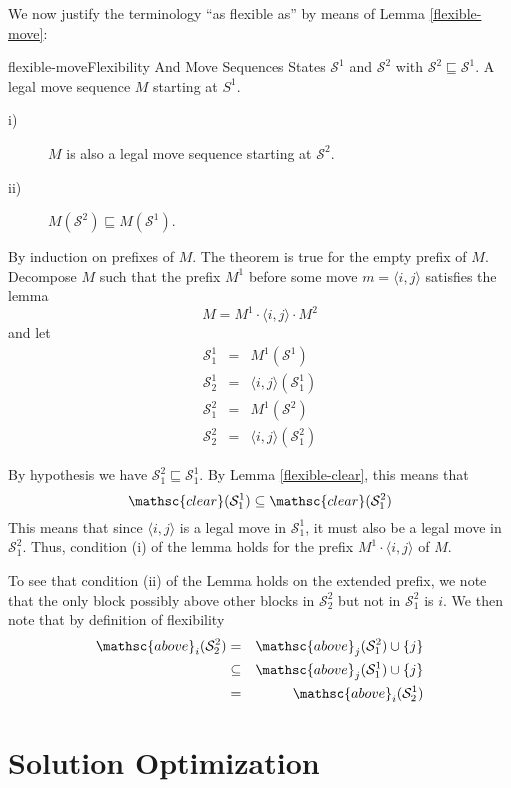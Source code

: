 \documentclass{article}
\newcommand{\bstate}{{\mathcal{S}}}
\newcommand{\bclear}{{\mathsc{clear}}}
\newcommand{\babove}{{\mathsc{above}}}
\begin{document}
We now justify the terminology ``as flexible as''
by means of Lemma \ref{flexible-move}:
\begin{lemma}{flexible-move}{Flexibility And Move Sequences}
\given
States $\bstate^1$ and $\bstate^2$ with $\bstate^2 \sqsubseteq \bstate^1$.
A legal move sequence $M$ starting at $S^1$.
\prove
\begin{description}
\item[i)~] $M$ is also a legal move sequence starting at $\bstate^2$.
\item[ii)~] $M(\bstate^2) \sqsubseteq M(\bstate^1)$.
\end{description}
\proof
By induction on prefixes of $M$.
\basecase
The theorem is true for the empty prefix of $M$.
\indcase
Decompose $M$ such that the prefix $M^1$ before
some move $m = \langle i, j \rangle$ satisfies the lemma $$
  M = M^1 \cdot \langle i, j \rangle \cdot M^2
$$
and let
\begin{eqnarray*}
  \bstate^1_1 &=& M^1(\bstate^1) \\
  \bstate^1_2 &=& \langle i, j \rangle(\bstate^1_1) \\
  \bstate^2_1 &=& M^1(\bstate^2) \\
  \bstate^2_2 &=& \langle i, j \rangle(\bstate^2_1)
\end{eqnarray*}

By hypothesis we have $\bstate^2_1 \sqsubseteq \bstate^1_1$.
By Lemma \ref{flexible-clear}, this means that $$
  \bclear(\bstate^1_1) \subseteq \bclear(\bstate^2_1)
$$
This means that since $\langle i, j \rangle$ is a legal
move in $\bstate^1_1$, it must also be a legal move in
$\bstate^2_1$.  Thus, condition (i) of the lemma holds
for the prefix $M^1 \cdot \langle i, j \rangle$ of $M$.

To see that condition (ii) of the Lemma holds on the extended
prefix, we note that the only block possibly above other blocks in
$\bstate^2_2$ but not in $\bstate^2_1$ is $i$.  We then note that
by definition of flexibility
\begin{eqnarray*}
  \babove_i(\bstate^2_2) &=& \babove_j(\bstate^2_1) \cup \{j\} \\
  &\subseteq& \babove_j(\bstate^1_1) \cup \{j\} \\
  &=& \babove_i(\bstate^1_2)
\end{eqnarray*}
\end{lemma}
  
\section{Solution Optimization}
\end{document}
